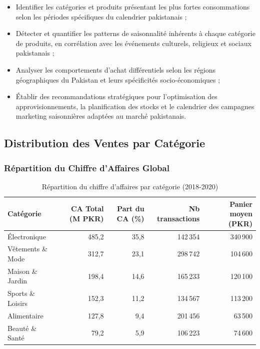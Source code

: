 \documentclass[a4paper,12pt]{article}
\begin{document}
\begin{itemize}
    \item Identifier les catégories et produits présentant les plus fortes consommations selon les périodes spécifiques du calendrier pakistanais ;
    \item Détecter et quantifier les patterns de saisonnalité inhérents à chaque catégorie de produits, en corrélation avec les événements culturels, religieux et sociaux pakistanais ;
    \item Analyser les comportements d'achat différentiels selon les régions géographiques du Pakistan et leurs spécificités socio-économiques ;
    \item Établir des recommandations stratégiques pour l'optimisation des approvisionnements, la planification des stocks et le calendrier des campagnes marketing saisonnières adaptées au marché pakistanais.
\end{itemize}

\subsection{Distribution des Ventes par Catégorie}

\subsubsection{Répartition du Chiffre d'Affaires Global}

\begin{table}[H]
\centering
\caption{Répartition du chiffre d'affaires par catégorie (2018-2020)}
\label{tab:ca_categorie}
\begin{tabular}{|l|r|r|r|r|}
\hline
\textbf{Catégorie} & \textbf{CA Total (M PKR)} & \textbf{Part du CA (\%)} & \textbf{Nb transactions} & \textbf{Panier moyen (PKR)} \\
\hline
Électronique & 485,2 & 35,8 & 142\,354 & 340\,900 \\
\hline
Vêtements \& Mode & 312,7 & 23,1 & 298\,742 & 104\,600 \\
\hline
Maison \& Jardin & 198,4 & 14,6 & 165\,233 & 120\,100 \\
\hline
Sports \& Loisirs & 152,3 & 11,2 & 134\,567 & 113\,200 \\
\hline
Alimentaire & 127,8 & 9,4 & 201\,456 & 63\,500 \\
\hline
Beauté \& Santé & 79,2 & 5,9 & 106\,223 & 74\,600 \\
\hline
\end{tabular}
\end{table}
\end{document}
